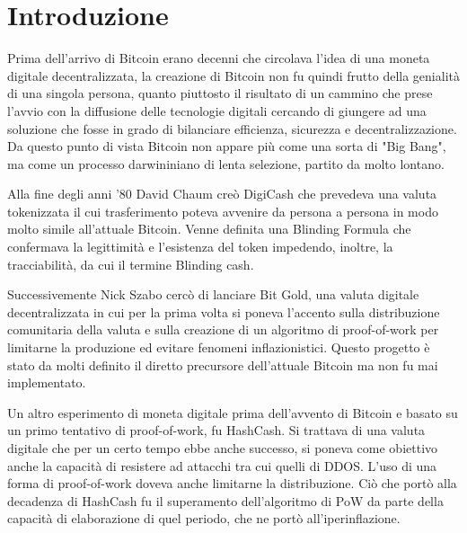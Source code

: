 
\cleardoublepage
{}

\chapter*{Introduzione}
Prima dell'arrivo di Bitcoin erano decenni che circolava l'idea di una moneta digitale decentralizzata, la creazione di Bitcoin non fu quindi frutto della genialità di una singola persona, quanto piuttosto il risultato di un cammino che prese l'avvio con la diffusione delle tecnologie digitali cercando di giungere ad una soluzione che fosse in grado di bilanciare efficienza, sicurezza e decentralizzazione. Da questo punto di vista Bitcoin non appare più come una sorta di "Big Bang", ma come un processo darwininiano di lenta selezione, partito da molto lontano. 

Alla fine degli anni '80 David Chaum creò DigiCash che prevedeva una valuta tokenizzata il cui trasferimento poteva avvenire da persona a persona in modo molto simile all'attuale Bitcoin. Venne definita una Blinding Formula che confermava la legittimità e l'esistenza del token impedendo, inoltre, la tracciabilità, da cui il termine Blinding cash. 

Successivemente Nick Szabo cercò di lanciare Bit Gold, una valuta digitale decentralizzata in cui per la prima volta si poneva l'accento sulla distribuzione comunitaria della valuta e sulla creazione di un algoritmo di proof-of-work per limitarne la produzione ed evitare fenomeni inflazionistici. Questo progetto è stato da molti definito il diretto precursore dell'attuale Bitcoin ma non fu mai implementato.

Un altro esperimento di moneta digitale prima dell'avvento di Bitcoin e basato su un primo tentativo di proof-of-work, fu HashCash. Si trattava di una valuta digitale che per un certo tempo ebbe anche successo, si poneva come obiettivo anche la capacità di resistere ad attacchi tra cui quelli di DDOS. L'uso di una forma di proof-of-work doveva anche limitarne la distribuzione. Ciò che portò alla decadenza di HashCash fu il superamento dell'algoritmo di PoW da parte della capacità di elaborazione di quel periodo, che ne portò all'iperinflazione.


